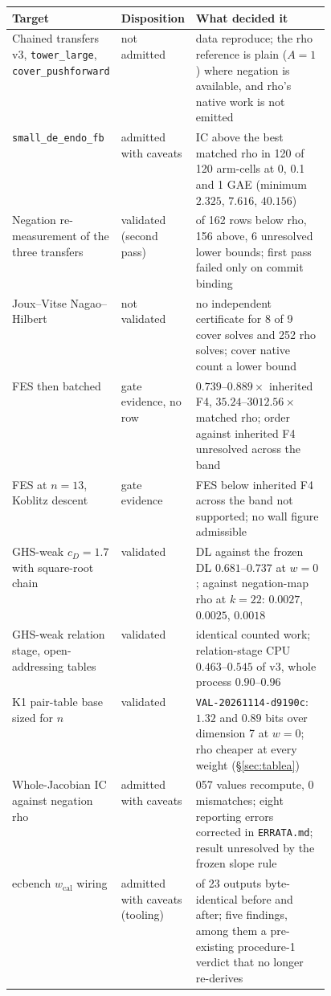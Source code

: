 \begin{table}[t]
\centering\small
\begin{tabularx}{\linewidth}{@{}>{\raggedright}p{0.26\linewidth}>{\raggedright}p{0.2\linewidth}>{\raggedright\arraybackslash}X@{}}
\toprule
Target & Disposition & What decided it \\
\midrule
Chained transfers v3, \texttt{tower\_large}, \texttt{cover\_pushforward} & not admitted & data reproduce; the rho reference is plain ($A=1$) where negation is available, and rho's native work is not emitted \\
\texttt{small\_de\_endo\_fb} & admitted with caveats & IC above the best matched rho in 120 of 120 arm-cells at 0, 0.1 and 1 GAE (minimum $2.325$, $7.616$, $40.156$) \\
Negation re-measurement of the three transfers & validated (second pass) & 0 of 162 rows below rho, 156 above, 6 unresolved lower bounds; first pass failed only on commit binding \\
Joux--Vitse Nagao--Hilbert & not validated & no independent certificate for 8 of 9 cover solves and 252 rho solves; cover native count a lower bound \\
FES then batched & gate evidence, no row & $0.739$--$0.889\times$ inherited F4, $35.24$--$3012.56\times$ matched rho; order against inherited F4 unresolved across the band \\
FES at $n=13$, Koblitz descent & gate evidence & FES below inherited F4 across the band not supported; no wall figure admissible \\
GHS-weak $c_D=1.7$ with square-root chain & validated & DL against the frozen DL $0.681$--$0.737$ at $w=0$; against negation-map rho at $k=22$: $0.0027$, $0.0025$, $0.0018$ \\
GHS-weak relation stage, open-addressing tables & validated & identical counted work; relation-stage CPU $0.463$--$0.545$ of v3, whole process $0.90$--$0.96$ \\
K1 pair-table base sized for $n$ & validated & \texttt{VAL-20261114-d9190c}: $1.32$ and $0.89$ bits over dimension 7 at $w=0$; rho cheaper at every weight (\S\ref{sec:tablea}) \\
Whole-Jacobian IC against negation rho & admitted with caveats & 2{,}057 values recompute, 0 mismatches; eight reporting errors corrected in \texttt{ERRATA.md}; result unresolved by the frozen slope rule \\
ecbench $w_{\mathrm{cal}}$ wiring & admitted with caveats (tooling) & 21 of 23 outputs byte-identical before and after; five findings, among them a pre-existing procedure-1 verdict that no longer re-derives \\

\end{tabularx}
\end{table}
